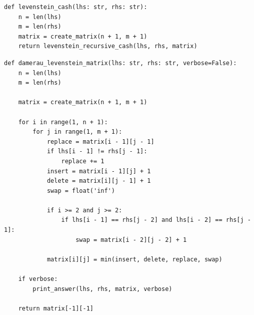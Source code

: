 \documentclass[a4paper, 12pt]{extreport}
\begin{document}
\begin{center}
\captionsetup{justification=raggedright,singlelinecheck=off}
\begin{lstlisting}[label=lst:levenstein_cash,caption=Реализация нахождения расстояния Левенштейна с кэшированием]
def levenstein_cash(lhs: str, rhs: str):
    n = len(lhs)
    m = len(rhs)
    matrix = create_matrix(n + 1, m + 1)
    return levenstein_recursive_cash(lhs, rhs, matrix)
\end{lstlisting}
\end{center}

\clearpage

\begin{center}
\captionsetup{justification=raggedright,singlelinecheck=off}
\begin{lstlisting}[label=lst:damerau_levenstein_matrix,caption=Реализация матричного нахождения расстояния Дамерау~---~Левенштейна]
def damerau_levenstein_matrix(lhs: str, rhs: str, verbose=False):
    n = len(lhs)
    m = len(rhs)

    matrix = create_matrix(n + 1, m + 1)

    for i in range(1, n + 1):
        for j in range(1, m + 1):
            replace = matrix[i - 1][j - 1]
            if lhs[i - 1] != rhs[j - 1]:
                replace += 1
            insert = matrix[i - 1][j] + 1
            delete = matrix[i][j - 1] + 1
            swap = float('inf')

            if i >= 2 and j >= 2:
                if lhs[i - 1] == rhs[j - 2] and lhs[i - 2] == rhs[j - 1]:
                    swap = matrix[i - 2][j - 2] + 1
            
            matrix[i][j] = min(insert, delete, replace, swap)

    if verbose:
        print_answer(lhs, rhs, matrix, verbose)  

    return matrix[-1][-1]
\end{lstlisting}
\end{center}

\clearpage
\end{document}
